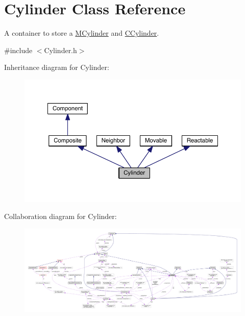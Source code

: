 \hypertarget{classCylinder}{\section{Cylinder Class Reference}
\label{classCylinder}
}


A container to store a \hyperlink{classMCylinder}{M\+Cylinder} and \hyperlink{classCCylinder}{C\+Cylinder}.  




{\ttfamily \#include $<$Cylinder.\+h$>$}



Inheritance diagram for Cylinder\+:\nopagebreak
\begin{figure}[H]
\begin{center}
\leavevmode
\includegraphics[width=350pt]{classCylinder__inherit__graph}
\end{center}
\end{figure}


Collaboration diagram for Cylinder\+:
\nopagebreak
\begin{figure}[H]
\begin{center}
\leavevmode
\includegraphics[width=350pt]{classCylinder__coll__graph}
\end{center}
\end{figure}

